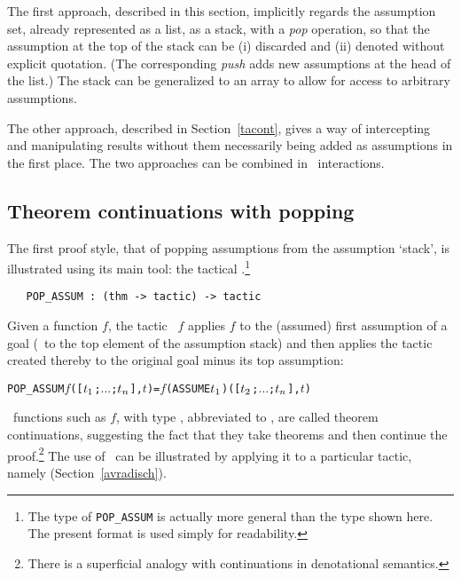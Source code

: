 The first
approach, described in this section, implicitly regards the assumption
set, already represented as a list, as a stack, with a {\it pop\/}
operation, so that the assumption at the top of the stack can be (i) discarded
and (ii) denoted without explicit quotation.  (The corresponding {\it push\/}
adds new assumptions at the head of the list.)
The stack can be generalized to an array to allow for access to
arbitrary assumptions.

The other approach, described in Section~\ref{tacont},
gives a way of intercepting and manipulating results without them necessarily
being added as assumptions in the first place.  The two approaches can
be combined in \HOL\ interactions.


\subsection{Theorem continuations with popping}
\label{avra_manip1}

The first proof style, that of popping assumptions
 from the assumption
`stack',
 is illustrated using its main tool: the tactical
.\footnote{The type of {\tt POP\_ASSUM} is actually more general
than the type shown here. The present format is used simply for readability.}

\begin{boxed}\begin{verbatim}
   POP_ASSUM : (thm -> tactic) -> tactic
\end{verbatim}\end{boxed}

\noindent Given a function $f$, the tactic
\ $f$ applies $f$ to the (assumed) first
assumption of a goal (\ie\ to the top element of the assumption stack)
and then applies the tactic created thereby to the original goal
minus its top assumption:

\begin{hol}\begin{alltt}
   POP_ASSUM \(f\) ([\(t\sb{1}\);\(\ldots\);\(t\sb{n}\)],\(t\)) = \(f\) (ASSUME \(t\sb{1}\)) ([\(t\sb{2}\);\(\ldots\);\(t\sb{n}\)],\(t\))
\end{alltt}\end{hol}

\noindent \ML\ functions such as $f$,
with type , abbreviated to ,
are called theorem continuations,
 suggesting the fact that they
take theorems and then continue the proof.\footnote{There is a superficial analogy
with continuations in denotational semantics.}
The use of \ can be illustrated by applying it
to a particular tactic, namely  (Section~\ref{avradisch}).

